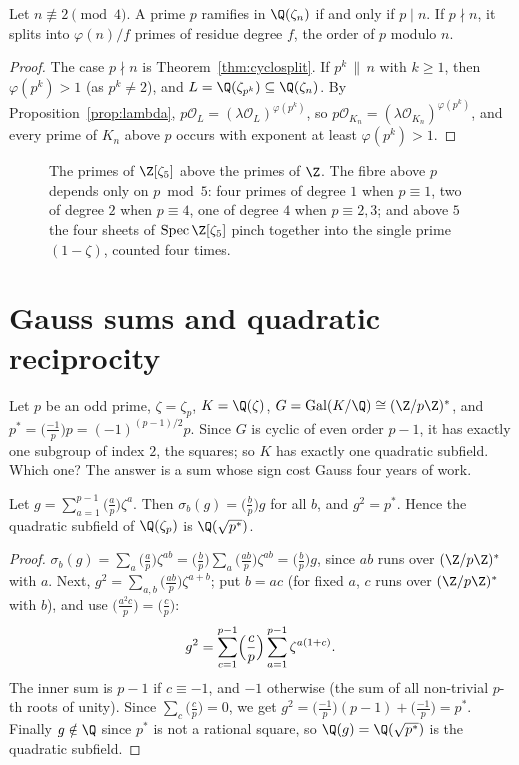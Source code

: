 \begin{corollary}\label{cor:cycloram}
Let $n\not\equiv2\pmod4$. A prime $p$ ramifies in $\Q(\zeta_n)$ if and only if $p\mid n$. If $p\nmid n$, it splits into
$\varphi(n)/f$ primes of residue degree $f$, the order of $p$ modulo $n$.
\end{corollary}
\begin{proof}
The case $p\nmid n$ is Theorem~\ref{thm:cyclosplit}. If $p^k\,\|\,n$ with $k\ge1$, then $\varphi(p^k)>1$ (as $p^k\ne2$), and
$L=\Q(\zeta_{p^k})\subseteq\Q(\zeta_n)$. By Proposition~\ref{prop:lambda}, $p\mathcal O_L=(\lambda\mathcal O_L)^{\varphi(p^k)}$, so
$p\mathcal O_{K_n}=(\lambda\mathcal O_{K_n})^{\varphi(p^k)}$, and every prime of $K_n$ above $p$ occurs with exponent at least
$\varphi(p^k)>1$.
\end{proof}

\begin{figure}[ht]
\centering
{}
\caption{The primes of $\Z[\zeta_5]$ above the primes of $\Z$. The fibre above $p$ depends only on $p\bmod 5$: four primes
of degree $1$ when $p\equiv1$, two of degree $2$ when $p\equiv4$, one of degree $4$ when $p\equiv2,3$; and above $5$ the
four sheets of $\operatorname{Spec}\Z[\zeta_5]$ pinch together into the single prime $(1-\zeta)$, counted four times.}
\label{fig:spec5}
\end{figure}

\section{Gauss sums and quadratic reciprocity}

Let $p$ be an odd prime, $\zeta=\zeta_p$, $K=\Q(\zeta)$, $G=\operatorname{Gal}(K/\Q)\cong(\Z/p\Z)^*$, and
$p^*=\bigl(\frac{-1}p\bigr)p=(-1)^{(p-1)/2}p$. Since $G$ is cyclic of even order $p-1$, it has exactly one subgroup of index
$2$, the squares; so $K$ has exactly one quadratic subfield. Which one? The answer is a sum whose sign cost Gauss four years of work.

\begin{proposition}\label{prop:gausssum}
Let $g=\sum_{a=1}^{p-1}\bigl(\frac ap\bigr)\zeta^a$. Then $\sigma_b(g)=\bigl(\frac bp\bigr)g$ for all $b$, and $g^2=p^*$.
Hence the quadratic subfield of $\Q(\zeta_p)$ is $\Q(\sqrt{p^*})$.
\end{proposition}
\begin{proof}
$\sigma_b(g)=\sum_a\bigl(\frac ap\bigr)\zeta^{ab}=\bigl(\frac bp\bigr)\sum_a\bigl(\frac{ab}p\bigr)\zeta^{ab}=\bigl(\frac bp
\bigr)g$, since $ab$ runs over $(\Z/p\Z)^*$ with $a$. Next, $g^2=\sum_{a,b}\bigl(\frac{ab}p\bigr)\zeta^{a+b}$; put $b=ac$
(for fixed $a$, $c$ runs over $(\Z/p\Z)^*$ with $b$), and use $\bigl(\frac{a^2c}p\bigr)=\bigl(\frac cp\bigr)$:
\[
g^2=\sum_{c=1}^{p-1}\Bigl(\frac cp\Bigr)\sum_{a=1}^{p-1}\zeta^{a(1+c)}.
\]
The inner sum is $p-1$ if $c\equiv-1$, and $-1$ otherwise (the sum of all non-trivial $p$-th roots of unity). Since
$\sum_c\bigl(\frac cp\bigr)=0$, we get $g^2=\bigl(\frac{-1}p\bigr)(p-1)+\bigl(\frac{-1}p\bigr)=p^*$. Finally $g\notin\Q$
since $p^*$ is not a rational square, so $\Q(g)=\Q(\sqrt{p^*})$ is the quadratic subfield.
\end{proof}

